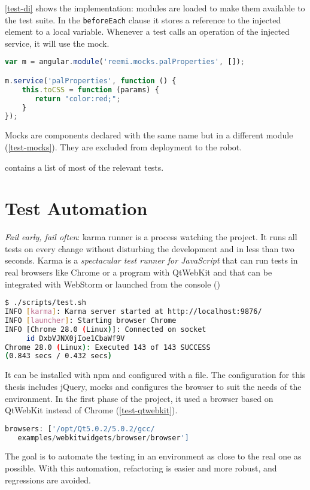 

\ref{test-di} shows the implementation: modules are loaded to make them available to the test suite.
In the \texttt{beforeEach} clause it stores a reference to the injected element to a local variable.
Whenever a test calls an operation of the injected service, it will use the mock.

\begin{lstlisting}[label=test-mocks,language=javascript, caption=Mocks]
var m = angular.module('reemi.mocks.palProperties', []);

m.service('palProperties', function () {
	this.toCSS = function (params) {
       return "color:red;";
	}
});
\end{lstlisting}

Mocks are components declared with the same name but in a different module (\ref{test-mocks}).
They are excluded from deployment to the robot.

 contains a list of most of the relevant tests.

\section{Test Automation}
\emph{Fail early, fail often}: karma runner is a process watching the project. 
It runs all tests on every change without disturbing the development and in less than two seconds.
Karma is a \textit{spectacular test runner for JavaScript} that can run tests in real browsers like Chrome or a program with QtWebKit and that can be integrated with WebStorm or launched from the console ()

\begin{lstlisting}[label=test-launch-karma,language=bash, caption=Launching Karma Runner]
$ ./scripts/test.sh
INFO [karma]: Karma server started at http://localhost:9876/
INFO [launcher]: Starting browser Chrome
INFO [Chrome 28.0 (Linux)]: Connected on socket 
     id DxbVJNX0jIoe1CbaWf9V
Chrome 28.0 (Linux): Executed 143 of 143 SUCCESS 
(0.843 secs / 0.432 secs)
\end{lstlisting}

It can be installed with \ac{npm} and configured with a file.
The configuration for this thesis includes jQuery, mocks and configures the browser to suit the needs of  the environment.
In the first phase of the project, it used a browser based on QtWebKit instead of Chrome (\ref{test-qtwebkit}).

\begin{lstlisting}[label=test-qtwebkit,language=javascript, caption=Configuration to use QtWebkit browser]
browsers: ['/opt/Qt5.0.2/5.0.2/gcc/
   examples/webkitwidgets/browser/browser']
\end{lstlisting}

The goal is to automate the testing in an environment as close to the real one as possible.  
With this automation, refactoring is easier and more robust, and regressions are avoided.
